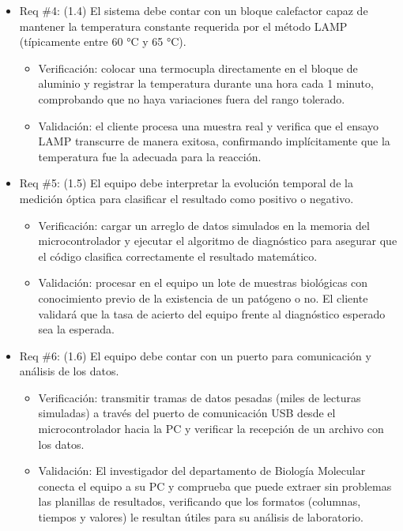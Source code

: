 \documentclass[
11pt, %
]{charter}
\begin{document}
\begin{itemize}
\item Req \#4: (1.4) El sistema debe contar con un bloque calefactor capaz de mantener la temperatura constante requerida por el método LAMP (típicamente entre 60 °C y 65 °C).

\begin{itemize}
	\item Verificación: colocar una termocupla directamente en el bloque de aluminio y registrar la temperatura durante una hora cada 1 minuto, comprobando que no haya variaciones fuera del rango tolerado.
	\item Validación: el cliente procesa una muestra real y verifica que el ensayo LAMP transcurre de manera exitosa, confirmando implícitamente que la temperatura fue la adecuada para la reacción.
\end{itemize}

\end{itemize}

\begin{itemize}
\item Req \#5: (1.5) El equipo debe interpretar la evolución temporal de la medición óptica para clasificar el resultado como positivo o negativo.

\begin{itemize}
	\item Verificación: cargar un arreglo de datos simulados en la memoria del microcontrolador  y ejecutar el algoritmo de diagnóstico  para asegurar que el código clasifica correctamente el resultado matemático.
	\item Validación: procesar en el equipo un lote de muestras biológicas con conocimiento previo de la existencia de un patógeno o no. El cliente validará que la tasa de acierto del equipo frente al diagnóstico esperado sea la esperada.
\end{itemize}

\end{itemize}

\begin{itemize}
\item Req \#6: (1.6) El equipo debe contar con un puerto para comunicación y análisis de los datos.

\begin{itemize}
	\item Verificación: transmitir tramas de datos pesadas (miles de lecturas simuladas) a través del puerto de comunicación USB desde el microcontrolador hacia la PC y verificar la recepción de un archivo con los datos.
	\item Validación: El investigador del departamento de Biología Molecular conecta el equipo a su PC y comprueba que puede extraer sin problemas las planillas de resultados, verificando que los formatos (columnas, tiempos y valores) le resultan útiles para su análisis de laboratorio.
\end{itemize}

\end{itemize}
\end{document}
